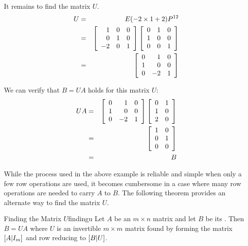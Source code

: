 \begin{solution}
It remains to find the matrix $U$. 
\begin{eqnarray*}
U &=& E(-2 \times 1 + 2) P^{12} \\
&=& \left[ \begin{array}{rrr}
1 & 0 & 0 \\
0 & 1 & 0 \\
-2 & 0 & 1 
\end{array} \right]
\left[ \begin{array}{rrr}
0 & 1 & 0 \\
1 & 0 & 0 \\
0 & 0 & 1 
\end{array} \right] \\
&=& \left[
\begin{array}{rrr}
0 & 1 & 0\\
1 & 0 & 0 \\
0 & -2  & 1 
\end{array}
\right]
\end{eqnarray*}


We can verify that $B = UA$ holds for this matrix $U$:
\begin{eqnarray*}
UA &=& \left[
\begin{array}{rrr}
0 & 1 & 0\\
1 & 0 & 0 \\
0 & -2  & 1 
\end{array}
\right]
\left[
\begin{array}{rr}
0 & 1 \\
1 & 0 \\
2 & 0
\end{array}
\right] \\
&=& \left[ \begin{array}{rr}
1 & 0 \\
0 & 1 \\
0 & 0 
\end{array} \right] \\
&=& B 
\end{eqnarray*} 
\end{solution}

While the process used in the above example is reliable and simple when only a few row operations are used, it becomes cumbersome in a case where many row operations are needed to carry $A$ to $B$. The following theorem provides an alternate way to find the matrix $U$. 

\begin{theorem}{Finding the Matrix $U$}{findingu}
Let $A$ be an $m \times n$ matrix and let $B$ be its {\rref}. Then $B = UA$ where $U$ is an invertible $m \times m$ matrix found by forming the matrix $ \left[ A | I_m \right]$ and row reducing to $\left[ B | U \right]$. 
\end{theorem}

